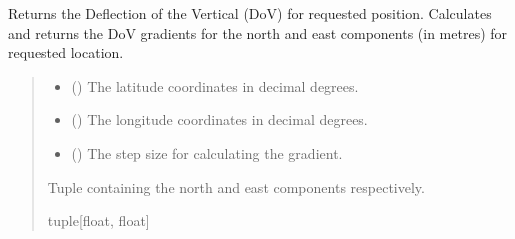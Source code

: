 \documentclass[letterpaper,10pt,english]{sphinxmanual}
\begin{document}
\begin{fulllineitems}
\begin{fulllineitems}
\label{\detokenize{modules/earth/geoid:qnav.earth.geoid.GeoidPGM.get_dov_vec}}
\pysigstartsignatures
{}
\pysigstopsignatures
\sphinxAtStartPar
Returns the Deflection of the Vertical (DoV) for requested position.
Calculates and returns the DoV gradients for the north and east
components (in metres) for requested location.
\begin{quote}\begin{description}
\begin{itemize}
\item {} 
\sphinxAtStartPar
{} () \textendash{} The latitude coordinates in decimal degrees.

\item {} 
\sphinxAtStartPar
{} () \textendash{} The longitude coordinates in decimal degrees.

\item {} 
\sphinxAtStartPar
{} () \textendash{} The step size for calculating the gradient.

\end{itemize}

\sphinxAtStartPar
Tuple containing the north and east components respectively.

\sphinxAtStartPar
tuple{[}float, float{]}

\end{description}\end{quote}

\end{fulllineitems}



\end{fulllineitems}
\end{document}
